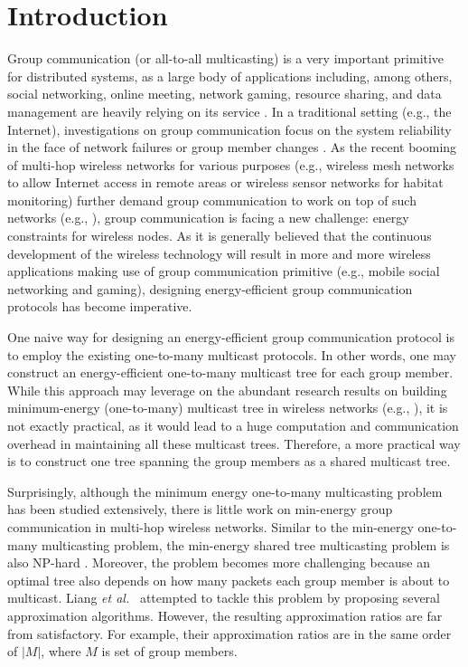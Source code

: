 \documentclass[10pt, conference, compsocconf]{IEEEtran}
\begin{document}
\section{Introduction} \label{sec:intro}
Group communication (or all-to-all multicasting) is a very important primitive for distributed systems, as a large body of applications including, among others, social networking, online meeting, network gaming, resource sharing, and data management are heavily relying on its service \cite{Powell-CACM96,Chockler-CS01}. In a traditional setting (e.g., the Internet), investigations on group communication focus on the system reliability in the face of network failures or group member changes \cite{Chockler-CS01}. As the recent booming of multi-hop wireless networks for various purposes (e.g., wireless mesh networks to allow Internet access in remote areas or wireless sensor networks for habitat monitoring) further demand group communication to work on top of such networks (e.g., \cite{YuC-MSWiM09}), group communication is facing a new challenge: energy constraints for wireless nodes. As it is generally believed that the continuous development of the wireless technology will result in more and more wireless applications making use of group communication primitive (e.g., mobile social networking and gaming), designing energy-efficient group communication protocols has become imperative.

  One naive way for designing an energy-efficient group communication protocol is to employ the existing one-to-many multicast protocols. In other words, one may construct an energy-efficient one-to-many multicast tree for each group member. While this approach may leverage on the abundant research results on building minimum-energy (one-to-many) multicast tree in wireless networks (e.g., \cite{Wieselthier2000,Wan2004,Liang2006,Li2007}), it is not exactly practical, as it would lead to a huge computation and communication overhead in maintaining all these multicast trees. Therefore, a more practical way is to construct one tree spanning the group members as a shared multicast tree.

  Surprisingly, although the minimum energy one-to-many multicasting problem has been studied extensively, there is little work on min-energy group communication in multi-hop wireless networks. Similar to the min-energy one-to-many multicasting problem, the min-energy shared tree multicasting problem is also NP-hard \cite{Liang2009}. Moreover, the problem becomes more challenging because an optimal tree also depends on how many packets each group member is about to multicast. Liang \textit{et al.}\ \cite{Liang2009} attempted to tackle this problem by proposing several approximation algorithms. However, the resulting approximation ratios are far from satisfactory. For example, their approximation ratios are in the same order of $|M|$, where $M$ is set of group members.
\end{document}
